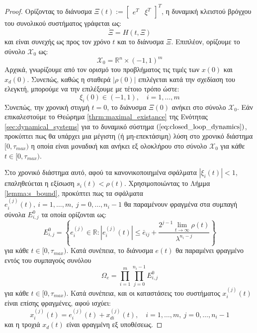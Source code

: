 \begin{proof}
Ορίζοντας το διάνυσμα $\Xi(t) := \begin{bmatrix}e^T & \xi^T \end{bmatrix}^T$, η δυναμική κλειστού βρόγχου του συνολικού συστήματος γράφεται ως:
\begin{equation}
	\dot{\Xi} = H(t, \Xi )
	\label{eq:closed_loop_dynamics}
\end{equation}
και είναι συνεχής ως προς τον χρόνο $t$ και το διάνυσμα $\Xi$. Επιπλέον, ορίζουμε το σύνολο $\mathcal{X}_0$ ως:
\begin{equation}
	\mathcal{X}_0 = \mathbb{R}^n \times (-1,1)^m
	\label{eq:initial_solution_set}
\end{equation}
Αρχικά, γνωρίζουμε από τον ορισμό του προβλήματος τις τιμές των $x(0)$ και $x_d(0)$. Συνεπώς, καθώς η σταθερά  $| \rho(0) |$ επιλέγεται κατά την σχεδίαση του ελεγκτή, μπορούμε να την επιλέξουμε με τέτοιο τρόπο ώστε:
\begin{equation*}
	\xi_i(0) \in (-1,1), \quad i=1,\dots,m
\end{equation*}
Συνεπώς, την χρονική στιγμή $t=0$, το διάνυσμα $\Xi(0)$ ανήκει στο σύνολο $\mathcal{X}_0$. Εάν επικαλεστούμε το Θεώρημα \ref{thrm:maximal_existance} της Ενότητας \ref{sec:dynamical_systems} για το δυναμικό σύστημα $(\ref{eq:closed_loop_dynamics})$, προκύπτει πως θα υπάρχει μια μέγιστη (ή μη-επεκτάσιμη) λύση στο χρονικό διάστημα $[0,\tau_{max})$ η οποία είναι μοναδική και ανήκει εξ ολοκλήρου στο σύνολο $\mathcal{X}_0$ για κάθε $t \in [0, \tau_{max})$.

Στο χρονικό διάστημα αυτό, αφού τα κανονικοποιημένα σφάλματα $| \xi_i(t) | < 1$, επαληθεύεται η εξίσωση $s_i(t) < \rho(t)$. Χρησιμοποιώντας το Λήμμα \ref{lemma:s_bound}, προκύπτει πως τα σφάλματα $e_i^{(j)}(t), \: i = 1,\dots,m, \: j = 0,\dots,n_i-1$ θα παραμένουν φραγμένα στα συμπαγή σύνολα $E_{i,j}^0$ τα οποία ορίζονται ως:
\begin{equation*}
E_{i,j}^0 = \left\{ e_i^{(j)} \in \mathbb{R} :
| e_i^{(j)}(t) | \leq \bar e_{ij} + 
\frac{ 2^{j-1} \lim\limits_{t \rightarrow \infty}\rho(t)}{\lambda^{n_i - j}} \right\}
\end{equation*}
για κάθε $t \in [0, \tau_{max})$. Κατά συνέπεια, το διάνυσμα $e(t)$ θα παραμένει φραγμένο εντός του συμπαγούς συνόλου
\begin{equation*}
\Omega_e = \prod_{i = 1}^{m} \prod_{j = 0}^{n_i-1} E_{i,j}^0
\label{eq:e_bounds}	
\end{equation*}
για κάθε $t \in [0, \tau_{max})$. Κατά συνέπεια, και οι καταστάσεις του συστήματος $x_i^{(j)}(t)$ είναι επίσης φραγμένες, αφού ισχύει:
\begin{equation*}
	x_i^{(j)}(t) = e_i^{(j)}(t) + x_{di}^{(j)}(t), 
	\quad i= 1,\dots,m , \: j = 0,\dots, n_i - 1
\end{equation*}
και η τροχιά $x_d(t)$ είναι φραγμένη εξ υποθέσεως.


\end{proof}
